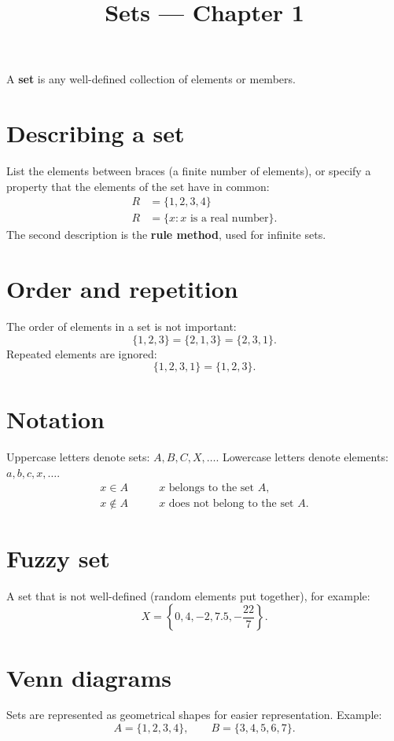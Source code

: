\documentclass[11pt]{article}
\title{Sets --- Chapter 1}
\author{}
\date{}
\begin{document}
\maketitle

\noindent A \textbf{set} is any well-defined collection of elements or members.

\section*{Describing a set}
List the elements between braces (a finite number of elements), or specify a
property that the elements of the set have in common:
\begin{align*}
  R &= \{1,2,3,4\} \\
  R &= \{x : x \text{ is a real number}\}.
\end{align*}
The second description is the \textbf{rule method}, used for infinite sets.

\section*{Order and repetition}
The order of elements in a set is not important:
\[
  \{1,2,3\} = \{2,1,3\} = \{2,3,1\}.
\]
Repeated elements are ignored:
\[
  \{1,2,3,1\} = \{1,2,3\}.
\]

\section*{Notation}
Uppercase letters denote sets: $A,B,C,X,\ldots$.
Lowercase letters denote elements: $a,b,c,x,\ldots$.
\begin{align*}
  x \in A &\qquad x \text{ belongs to the set } A, \\
  x \notin A &\qquad x \text{ does not belong to the set } A.
\end{align*}

\section*{Fuzzy set}
A set that is not well-defined (random elements put together), for example:
\[
  X = \left\{0,4,-2,7.5,-\frac{22}{7}\right\}.
\]

\section*{Venn diagrams}
Sets are represented as geometrical shapes for easier representation. Example:
\[
  A = \{1,2,3,4\}, \qquad B = \{3,4,5,6,7\}.
\]
\end{document}
